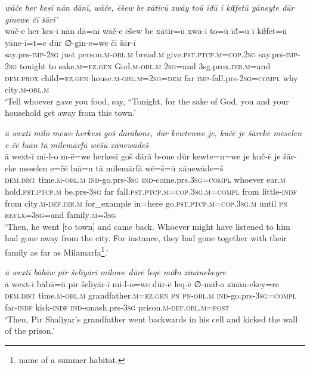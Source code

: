 \ea \label{BP.165}
\textit{wāče her kesī nān dānī, wāče, ēšew be xātirū xwāy toū īđū ī kiɫfetū yāneyte dūr ginewe čī šārī’} \\ 
\gll wāč-e her kes-ī nān dā=nī wāč-e ēšew be xātir=ū xwā-ī to=ū īđ=ū ī kiɫfet=ū yāne-ī=t=e dūr ∅-gin-e=we čī šār-ī \\ 
 say.prs-\textsc{imp-}\textsc{2sg} just person\textsc{.m}\textsc{-obl}\textsc{.m} bread\textsc{.m} give\textsc{.pst}\textsc{.ptcp}\textsc{.m}\textsc{=cop}\textsc{.\textsc{2sg}} say.prs-\textsc{imp-}\textsc{2sg} tonight to sake\textsc{.m}\textsc{=ez.gen} God\textsc{.m}\textsc{-obl}\textsc{.m} \textsc{2sg}=and 3sg.prox\textsc{.dir}\textsc{.m}=and \textsc{dem.prox} child\textsc{=ez.gen} house\textsc{.m}\textsc{-obl}\textsc{.m}\textsc{=\textsc{2sg}}\textsc{=dem} far \textsc{imp-}fall.prs-\textsc{2sg}\textsc{=compl} why city\textsc{.m}\textsc{-obl}\textsc{.m} \\ 
\glt `Tell whoever gave you food, say, “Tonight, for the sake of God, you and your household get away from this town.'
\z 
 
\ea \label{BP.167}
\textit{ā wextī milo mēwe herkesī goš dārābone, dūr kewtenwe je, kučē je šāreke meselen e čē luān tā milemārfā wēšū xānewādeš} \\ 
\gll ā wext-ī mi-l-o m-ē=we herkesī goš dārā b-one dūr kewte=n=we je kuč-ē je šār-eke meselen e=čē luā=n tā milemārfā wē=š=ū xānewāde=š \\ 
 \textsc{dem.dist} time\textsc{.m}\textsc{-obl}\textsc{.m} \textsc{ind-}go.prs\textsc{-3sg} \textsc{ind-}come.prs\textsc{.3sg}\textsc{=compl} whoever ear\textsc{.m} hold\textsc{.pst}\textsc{.ptcp}\textsc{.m} be.prs\textsc{-3sg} far fall\textsc{.pst}\textsc{.ptcp}\textsc{.m}\textsc{=cop}\textsc{.3sg}\textsc{.m}\textsc{=compl} from little\textsc{-indf} from city\textsc{.m}\textsc{-def}\textsc{.dir}\textsc{.m} for\_example in=here go\textsc{.pst}\textsc{.ptcp}\textsc{.m}\textsc{=cop}\textsc{.3sg}\textsc{.m} until \textsc{pn} \textsc{reflx}\textsc{=3sg}=and family\textsc{.m}\textsc{=3sg} \\ 
\glt `Then, he went [to town] and came back. Whoever might have listened to him had gone away from the city. For instance, they had gone together with their family as far as Milamarfa\footnote{name of a summer habitat.}.'
\z 
 
\ea \label{BP.168}
\textit{ā wextī bābāw pīr šelīyārī milowe dūrē leqē māɫo zīnānekeyre} \\ 
\gll ā wext-ī bābā=ū pīr šelīyār-ī mi-l-o=we dūr-ē leq-ē ∅-māɫ-o zīnān-ekey=re \\ 
 \textsc{dem.dist} time\textsc{.m}\textsc{-obl}\textsc{.m} grandfather\textsc{.m}\textsc{=ez.gen} \textsc{pn} \textsc{pn}\textsc{-obl}\textsc{.m} \textsc{ind-}go.prs\textsc{-3sg}\textsc{=compl} far\textsc{-indf} kick\textsc{-indf} \textsc{ind-}smash.prs\textsc{-3sg} prison\textsc{.m}\textsc{-def}\textsc{.obl}\textsc{.m}\textsc{=\textsc{post}} \\ 
\glt `Then, Pir Shaliyar’s grandfather went backwards in his cell and kicked the wall of the prison.'
\z 
 
